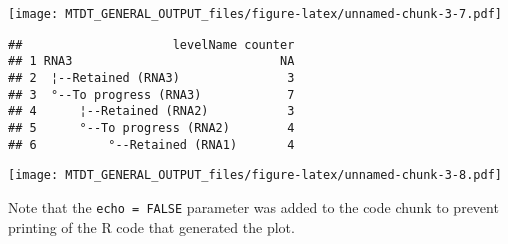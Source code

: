 \documentclass[
]{article}
\begin{document}
\texttt{[image: MTDT\_GENERAL\_OUTPUT\_files/figure-latex/unnamed-chunk-3-7.pdf]}

\begin{verbatim}
##                     levelName counter
## 1 RNA3                             NA
## 2  ¦--Retained (RNA3)               3
## 3  °--To progress (RNA3)            7
## 4      ¦--Retained (RNA2)           3
## 5      °--To progress (RNA2)        4
## 6          °--Retained (RNA1)       4
\end{verbatim}

\texttt{[image: MTDT\_GENERAL\_OUTPUT\_files/figure-latex/unnamed-chunk-3-8.pdf]}

Note that the \texttt{echo\ =\ FALSE} parameter was added to the code
chunk to prevent printing of the R code that generated the plot.
\end{document}
